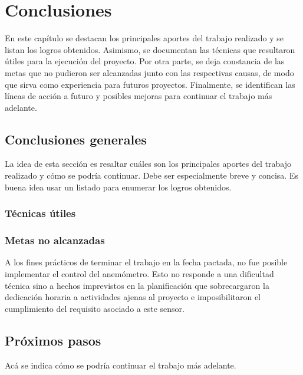 
\chapter{Conclusiones} %

\label{Chapter5} %

En este capítulo se destacan los principales aportes del trabajo realizado y se listan los logros obtenidos.  Asimismo, se documentan las técnicas que resultaron  útiles para la ejecución del proyecto.  Por otra parte, se deja constancia de las metas que no pudieron ser alcanzadas junto con las respectivas causas, de modo que sirva como experiencia para futuros proyectos.  Finalmente, se identifican las líneas de acción a futuro y posibles mejoras para continuar el trabajo más adelante.


\section{Conclusiones generales }

La idea de esta sección es resaltar cuáles son los principales aportes del trabajo realizado y cómo se podría continuar. Debe ser especialmente breve y concisa. Es buena idea usar un listado para enumerar los logros obtenidos.

\subsection{Técnicas útiles}

\subsection{Metas no alcanzadas}
\label{subsec:metasnoalcanzadas}

A los fines prácticos de terminar el trabajo en la fecha pactada, no fue posible implementar el control del anemómetro.  Esto no responde a una dificultad técnica sino a hechos imprevistos en la planificación que sobrecargaron la dedicación horaria a actividades ajenas al proyecto e imposibilitaron el cumplimiento del requisito asociado a este sensor.

\section{Próximos pasos}

Acá se indica cómo se podría continuar el trabajo más adelante.
